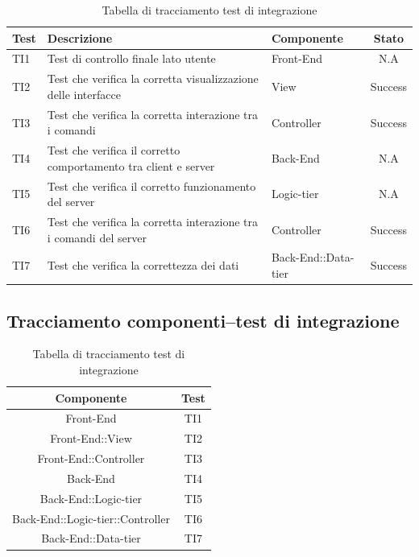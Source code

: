 \begin{center}
	\begin{table}[h]
		\begin{tabular}{|l|p{}|l|c|}
		\toprule
			\textbf{Test} & \textbf{Descrizione} & \textbf{Componente} & \textbf{Stato} \\
			\midrule
			TI1 & Test di controllo finale lato utente & Front-End & N.A\\
			\midrule
			TI2 & Test che verifica la corretta visualizzazione delle interfacce & View & Success\\
			\midrule
			TI3 & Test che verifica la corretta interazione tra i comandi & Controller & Success\\
			\midrule
			TI4 & Test che verifica il corretto comportamento tra client e server & Back-End & N.A\\
			\midrule
			TI5 & Test che verifica il corretto funzionamento del server & Logic-tier & N.A\\
			\midrule
			TI6 & Test che verifica la corretta interazione tra i comandi del server & Controller & Success\\
			\midrule
			TI7 & Test che verifica la correttezza dei dati & Back-End::Data-tier & Success\\
		\bottomrule
		\end{tabular}
		\caption{Tabella di tracciamento test di integrazione}
	\end{table}
\end{center}
\newpage
\subsection{Tracciamento componenti–test di integrazione}
\begin{table}[h]
	\begin{center}
	\begin{tabular}{|c|c|}
	\toprule
		\textbf{Componente} & \textbf{Test}\\
	\midrule
		Front-End & TI1\\
	\midrule
		Front-End::View & TI2\\
	\midrule
		Front-End::Controller & TI3\\
	\midrule
		Back-End & TI4\\
	\midrule
		Back-End::Logic-tier & TI5\\
	\midrule
		Back-End::Logic-tier::Controller & TI6\\
	\midrule
		Back-End::Data-tier & TI7\\
	\bottomrule
	\end{tabular}
	\end{center}
	\caption{Tabella di tracciamento test di integrazione}
\end{table}


